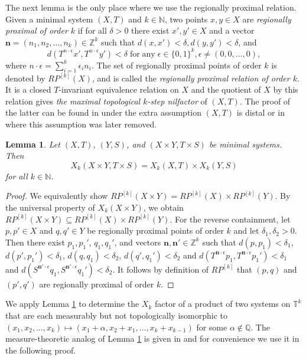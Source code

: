 \documentclass[12pt]{amsart}
\theoremstyle{definition}
\theoremstyle{plain}
\newtheorem{lemma}[theorem]{Lemma}
\theoremstyle{definition}
\numberwithin{equation}{section}
\begin{document}
\medskip


  The next lemma is the only place where we use the regionally proximal relation. Given a minimal system $(X,T)$ and $k\in \mathbb{N}$, two points $x,y\in X$ are \textit{regionally proximal of order $k$} if for all $\delta >0$ there exist $x',y' \in X$ and a vector $\textbf{n}=(n_1,n_2,\dots,n_k) \in \mathbb{Z}^{k}$ such that $d(x,x')<\delta, d(y,y')<\delta$, and $$d(T^{n \cdot \epsilon} x', T^{n\cdot \epsilon} y')<\delta \;\mathrm{for \; any}\; \epsilon \in \{0,1\}^{k}, \epsilon\neq(0,0,\dots,0),$$ where $n \cdot \epsilon=\sum_{i=1}^{k} \epsilon_i n_i.$ The set of regionally proximal points of order $k$ is denoted by $RP^{[k]}(X)$, and is called the \textit{ regionally proximal relation of order $k$}. It is a closed $T$-invariant equivalence relation on $X$ and the quotient of $X$ by this relation gives \textit{the maximal topological $k$-step nilfactor} of $(X,T).$ The proof of the latter can be found in \cite{Host Kra and Maass} under the extra assumption $(X,T)$ is distal or in \cite{Shao and Ye} where this assumption was later removed.

\begin{lemma}\label{product of top nil is top nil}
     Let $(X,T)$, $(Y,S)$, and $(X\times Y, T\times S)$ be minimal systems. Then $$X_k(X\times Y,T\times S)= X_k(X,T) \times X_k(Y,S)$$ for all $k \in \mathbb{N}$.
\end{lemma}

\begin{proof}
    We equivalently show $RP^{[k]}(X\times Y) = RP^{[k]}(X) \times RP^{[k]}(Y)$. By the universal property of $X_k(X \times Y)$, we obtain $RP^{[k]}(X\times Y) \subseteq RP^{[k]}(X) \times RP^{[k]}(Y)$. For the reverse containment, let $p,p'\in X$ and $q,q'\in Y$ be regionally proximal points of order $k$ and let $\delta_1,\delta_2>0$. Then there exist $p_1,p_1'$, $q_1,q_1'$, and vectors $\textbf{n}, \textbf{n}' \in \mathbb{Z}^{k}$ such that $d(p,p_1)<\delta_1$, $d(p',p_1')<\delta_1$, $d(q,q_1)<\delta_2$, $d(q',q_1')<\delta_2$ and $d(T^{\textbf{n}\cdot \epsilon}p_1,T^{\textbf{n}\cdot \epsilon}p_1')<\delta_1$ and $d(S^{\textbf{n}'\cdot \epsilon}q_1, S^{\textbf{n}'\cdot \epsilon}q_1')<\delta_2.$ It follows by definition of $RP^{[k]}$ that $(p,q)$ and $(p',q')$ are regionally proximal of order $k$.
\end{proof}

We apply Lemma \ref{product of top nil is top nil} to determine the $X_k$ factor of a product of two systems on $\mathbb{T}^{k}$ that are each measurably but not topologically isomorphic to $(x_1,x_2,\dots,x_k)\mapsto(x_1+\alpha,x_2+x_1,\dots,x_k+x_{k-1})$ for some $\alpha \notin \mathbb{Q}$. The measure-theoretic analog of Lemma \ref{product of top nil is top nil} is given in \cite{Radic} and for convenience we use it in the following proof.
\end{document}
